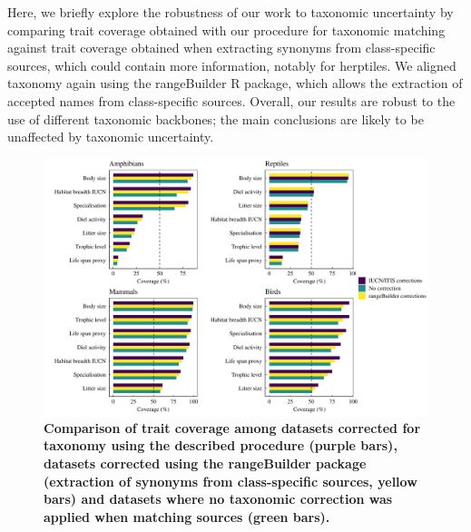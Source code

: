 Here, we briefly explore the robustness of our work to taxonomic uncertainty by comparing trait coverage obtained with our procedure for taxonomic matching against trait coverage obtained when extracting synonyms from class-specific sources, which could contain more information, notably for herptiles. We aligned taxonomy again using the rangeBuilder R package, which allows the extraction of accepted names from class-specific sources. Overall, our results are robust to the use of different taxonomic backbones; the main conclusions are likely to be unaffected by taxonomic uncertainty.

\begin{figure}[h!]
\centering
\includegraphics[scale=0.6]{Supporting/Chapter2/Figures/Coverage/DeltaCov_F3}
\caption[]{\textbf{Comparison of trait coverage among datasets corrected for taxonomy using the described procedure (purple bars), datasets corrected using the rangeBuilder package (extraction of synonyms from class-specific sources, yellow bars) and datasets where no taxonomic correction was applied when matching sources (green bars).}}
\label{SI2_taxcor_rangebuilder}
\end{figure}